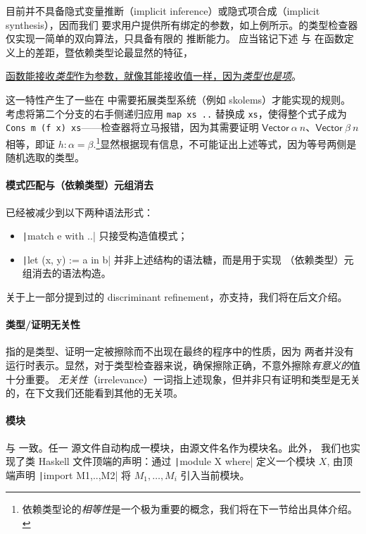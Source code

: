 \Tigrisd 目前并不具备隐式变量推断（implicit inference）或隐式项合成（implicit synthesis），因而我们
要求用户提供所有绑定的参数，如上例所示。\Tigrisd 的类型检查器仅实现一简单的双向算法，只具备有限的
推断能力。
应当铭记下述 \Tigris 与 \Tigrisd 在函数定义上的差距，暨依赖类型论最显然的特征，
\begin{center}
  \underline{函数能接收\emph{类型}作为参数，就像其能接收值一样，因为\emph{类型也是项}}。
\end{center}
这一特性产生了一些在 \Tigris 中需要拓展类型系统（例如 skolems）才能实现的规则。考虑将第二个分支的右手侧递归应用 \texttt{map xs ..} 替换成
\texttt{xs}，使得整个式子成为 \texttt{Cons m (f x) xs}——检查器将立马报错，因为其需要证明 $\mathsf{Vector}\ \alpha\ n$、$\mathsf{Vector}\ \beta\ n$
相等，即证 $h : \alpha=\beta$.\footnote{
  依赖类型论的\emph{相等性}是一个极为重要的概念，我们将在下一节给出具体介绍。
}显然根据现有信息，不可能证出上述等式，因为等号两侧是随机选取的类型。

\paragraph{模式匹配与（依赖类型）元组消去} 已经被减少到以下两种语法形式：
\vspace{-.8em}
\begin{itemize}\itemsep-.5em
    \item \texttt|match e with ..| 只接受构造值模式；
    \item \texttt|let (x, y) := a in b| 并非上述结构的语法糖，而是用于实现
    （依赖类型）元组消去的语法构造。
\end{itemize}
\vspace{-.8em}
关于上一部分提到过的 discriminant refinement，\Tigrisd 亦支持，我们将在后文介绍。

\paragraph{类型/证明无关性} 指的是类型、证明一定被擦除而不出现在最终的程序中的性质，因为
两者并没有运行时表示。显然，对于类型检查器来说，确保擦除正确，不意外擦除\emph{有意义的}值十分重要。
\emph{无关性}（irrelevance）一词指上述现象，但并非只有证明和类型是无关的，在下文我们还能看到其他的无关项。

\paragraph{模块} 与 \Tigris 一致。任一 \Tigrisd 源文件自动构成一模块，由源文件名作为模块名。此外，
我们也实现了类 Haskell 文件顶端的声明：通过 \texttt|module X where| 定义一个模块 $X$,
由顶端声明 \texttt|import M1,..,M2| 将 $M_1,\dots,M_i$ 引入当前模块。

